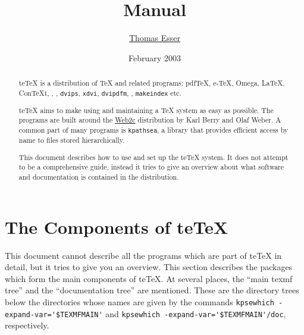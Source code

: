 \documentclass[11pt,a4paper]{article}
\title{\teTeX{} Manual}
\author{\href{mailto:te@dbs.uni-hannover.de}{Thomas Esser}}
\date{February 2003}
\newcommand{\teTeX}{\textrm{te}\TeX\xspace}
\begin{document}
\maketitle

\begin{abstract}
  
  \teTeX{} is a distribution of \TeX{} and related programs: pdf\TeX,
  e-\TeX, Omega, \LaTeX, Con\TeX{}t, \MF, \MP{}, \texttt{dvips},
  \texttt{xdvi}, \texttt{dvipdfm}, \BibTeX{}, \texttt{makeindex} etc.
  
  \teTeX{} aims to make using and maintaining a \TeX{} system as easy
  as possible. The programs are built around the
  \href{http://tug.org/web2c/}{Web2c} distribution by Karl Berry
  and Olaf Weber. A common part of many programs is \texttt{kpathsea},
  a library that provides efficient access by name to files stored
  hierarchically.
  
  This document describes how to use and set up the \teTeX{} system.
  It does not attempt to be a comprehensive guide, instead it tries to
  give an overview about what software and documentation is contained
  in the distribution.
\end{abstract}

\newpage
\tableofcontents

\newpage

\section{The Components of \teTeX}

This document cannot describe all the programs which are part of
\teTeX{} in detail, but it tries to give you an overview. This section
describes the packages which form the main components of \teTeX{}. At
several places, the ``main texmf tree'' and the ``documentation tree''
are mentioned. These are the directory trees below the directories
whose names are given by the commands
\verb+kpsewhich -expand-var='$TEXMFMAIN'+ and
\verb+kpsewhich -expand-var='$TEXMFMAIN'/doc+, respectively.
\end{document}
